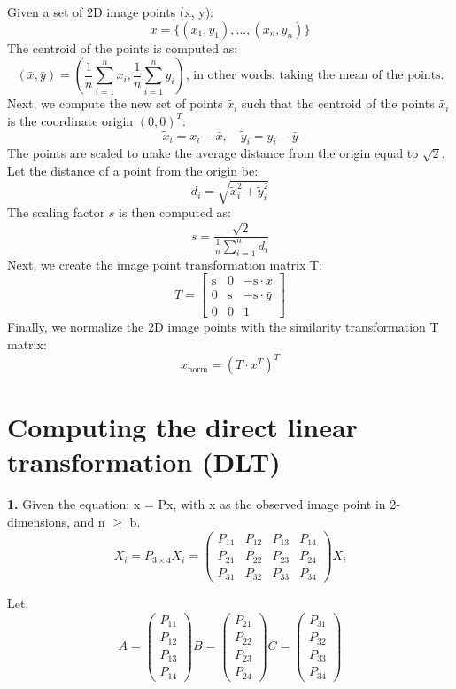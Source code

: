 \documentclass[12pt]{article}
\begin{document}
\noindent Given a set of 2D image points (x, y):
\[
    x = \{(x_1, y_1), ..., (x_n, y_n)\}
\]
The centroid of the points is computed as:
\[
        (\bar{x}, \bar{y}) = ( \frac{1}{n}\sum_{i=1}^{n} x_i,  \frac{1}{n}\sum_{i=1}^{n} y_i)
        \text{, in other words: taking the mean of the points.}
\]
Next, we compute the new set of points \( \tilde{x_i} \) such that the centroid of the points \( \tilde{x_i} \) is the coordinate origin \( (0, 0)^T \):
\[
    \tilde{x}_i = x_i - \bar{x}, \quad \tilde{y}_i = y_i - \bar{y}
\]
The points are scaled to make the average distance from the origin equal to \( \sqrt{2} \). Let the distance of a point from the origin be:
\[
    d_i = \sqrt{\tilde{x}_i^2 + \tilde{y}_i^2}
\]
The scaling factor \( s \) is then computed as:
\[
    s = \frac{\sqrt{2}}{\frac{1}{n} \sum_{i=1}^{n} d_i}
\]
Next, we create the image point transformation matrix T:
\[
T = \begin{bmatrix}
\text{s} & 0 & -\text{s} \cdot \bar{x} \\
0 & \text{s} & -\text{s} \cdot \bar{y} \\
0 & 0 & 1
\end{bmatrix}
\]
Finally, we normalize the 2D image points with the similarity transformation T matrix:
\[
x_{\text{norm}} = (T \cdot x^T)^T
\]

\section{Computing the direct linear transformation (DLT)}
\noindent
{\bf 1.} Given the equation: x = Px, with x as the observed image point in 2-dimensions, and n $\geq$ b.
\[ 
X_{i} = P_{3 \times 4} X_{i} = 
\begin{pmatrix}
P_{11} & P_{12} & P_{13} & P_{14} \\
P_{21} & P_{22} & P_{23} & P_{24} \\
P_{31} & P_{32} & P_{33} & P_{34}
\end{pmatrix} X_{i}
\]

\noindent Let:
\[ 
A = 
\begin{pmatrix}
P_{11} \\ P_{12} \\ P_{13} \\ P_{14}
\end{pmatrix}
B = 
\begin{pmatrix}
P_{21} \\ P_{22} \\ P_{23} \\ P_{24}
\end{pmatrix}
C = 
\begin{pmatrix}
P_{31} \\ P_{32} \\ P_{33} \\ P_{34}
\end{pmatrix}
\]
\end{document}

